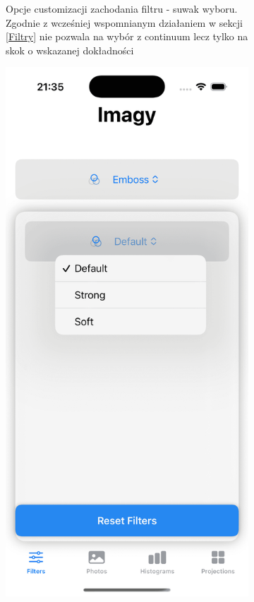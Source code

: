 \documentclass[a4paper]{article}
\begin{document}
\begin{figure}[H]
\begin{subfigure}{0.2\textwidth}
        \caption{Opcje customizacji zachodania filtru - suwak wyboru. Zgodnie z wcześniej wspomnianym działaniem w sekcji \ref{Filtry} nie pozwala na wybór z continuum lecz tylko na skok o wskazanej dokładności}
        \label{fig:filter_options_1}
    \end{subfigure}
    \hfill
    \begin{subfigure}{0.2\textwidth}
        \centering
        \includegraphics[width=\linewidth]{images/filter_options_2.png}

\end{subfigure}
\end{figure}
\end{document}
